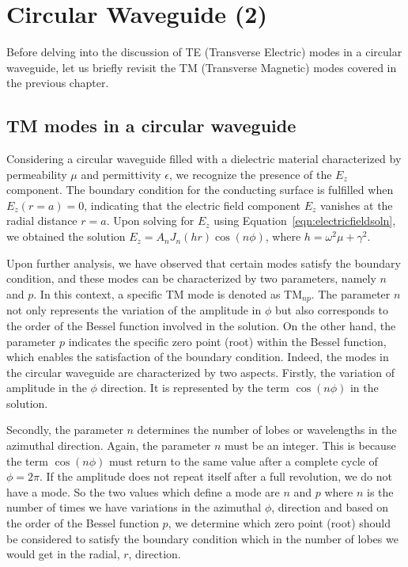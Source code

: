 \chapter{Circular Waveguide (2)}\label{lec:lec45}
Before delving into the discussion of TE (Transverse Electric) modes in a circular waveguide, let us briefly revisit the TM (Transverse Magnetic) modes covered in the previous chapter. 

\section{TM modes in a circular waveguide}
Considering a circular waveguide filled with a dielectric material characterized by permeability $\mu$ and permittivity $\epsilon$, we recognize the presence of the $E_z$ component. The boundary condition for the conducting surface is fulfilled when $E_z(r=a) = 0$, indicating that the electric field component $E_z$ vanishes at the radial distance $r=a$. Upon solving for $E_z$ using Equation~\eqref{eqn:electricfieldsoln}, we obtained the solution $E_z = A_n J_n(hr)\cos(n\phi)$, where $h = \omega^2\mu + \gamma^2$.

Upon further analysis, we have observed that certain modes satisfy the boundary condition, and these modes can be characterized by two parameters, namely $n$ and $p$. In this context, a specific TM mode is denoted as TM$_{np}$. The parameter $n$ not only represents the variation of the amplitude in $\phi$ but also corresponds to the order of the Bessel function involved in the solution. On the other hand, the parameter $p$ indicates the specific zero point (root) within the Bessel function, which enables the satisfaction of the boundary condition. Indeed, the modes in the circular waveguide are characterized by two aspects. Firstly, the variation of amplitude in the $\phi$ direction. It is represented by the term $\cos(n\phi)$ in the solution.

Secondly, the parameter $n$ determines the number of lobes or wavelengths in the azimuthal direction. Again, the parameter $n$ must be an integer. This is because the term $\cos(n\phi)$ must return to the same value after a complete cycle of $\phi=2\pi$. If the amplitude does not repeat itself after a full revolution, we do not have a mode. So the two values which define a mode are $n$ and $p$ where $n$ is the number of times we have variations in the azimuthal $\phi$, direction and based on the order of the Bessel function $p$, we determine which zero point (root) should be considered to satisfy the boundary condition which in the number of lobes we would get in the radial, $r$, direction.

